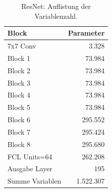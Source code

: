 \begin{table}
\centering
\caption{ResNet: Auflistung der Variablenzahl.}
\begin{tabular}{@{}lr@{}}
\hline
Block & Parameter\\
\hline
7x7 Conv &  3.328\\
Block 1 & 73.984\\
Block 2 & 73.984\\
Block 3 & 73.984\\
Block 4 & 73.984\\
Block 5 & 73.984\\
Block 6 & 295.552\\
Block 7 & 295.424\\
Block 8 & 295.680\\
FCL Units=64 & 262.208\\
Ausgabe Layer & 195\\
\hline
Summe Variablen & 1.522.307\\
\hline
\end{tabular}
\label{tb:resnet}
\end{table}

